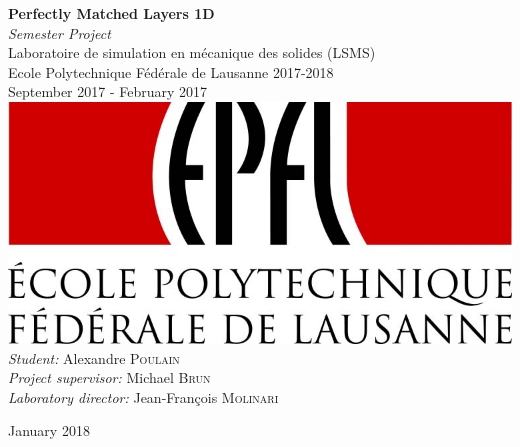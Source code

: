 \begin{titlepage}
\begin{sffamily}
\begin{center}
    \vspace*{2cm}
    \noindent\hrulefill 
    \vspace*{1cm}
    {\huge \bfseries Perfectly Matched Layers 1D}\\[0.5cm]
    {\huge  \itshape Semester Project} \\[0.5cm]
    {\large Laboratoire de simulation en mécanique des solides (LSMS)}\\[0.5cm]
    {\large Ecole Polytechnique Fédérale de Lausanne 2017-2018}\\[1cm]
    \noindent\hrulefill 
    \vspace{2cm}
    September 2017 - February 2017 \\[1cm]
    


      \includegraphics{images/EPFL-Logo.jpg}\\[1cm]
      

    \emph{Student:} Alexandre \textsc{Poulain}\\[1cm]
    \emph{Project supervisor:} Michael \textsc{Brun}\\[1cm]
    \emph{Laboratory director:} Jean-François \textsc{Molinari}

    
    
    \vfill{\large January 2018}

\end{center}
\end{sffamily}
\end{titlepage}